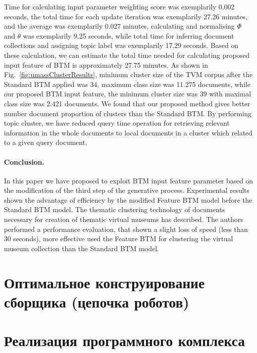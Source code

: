 Time for calculating input parameter weighting score was exemplarily 0.002 seconds, the total time for each update iteration was exemplarily 27.26 minutes, and the average was exemplarily 0.027 minutes, calculating and normalising \(\Phi\) and \(\theta\) was exemplarily 9.25 seconds, while total time for inferring document collections and assigning topic label was exemplarily 17.29 seconds. Based on these calculation, we can estimate the total time needed for calculating proposed input feature of BTM is approximately 27.75 minutes. As shown in Fig.~\cref{fig:umassClusterResults}, minimum cluster size of the TVM corpus after the Standard BTM applied was 34, maximum class size was 11.275 documents, while our proposed BTM input feature, the minimum cluster size was 39 with maximal class size was 2.421 documents. We found that our proposed method gives better number document proportion of clusters than the Standard BTM. By performing topic cluster, we have reduced query time operation for retrieving relevant information in the whole documents to local documents in a cluster which related to a given query document.

\paragraph{Conclusion.} In this paper we have proposed to exploit BTM input feature parameter based on the modification of the third step of the generative process. Experimental results shown the advantage of efficiency by the modified Feature BTM model before the Standard BTM model. The thematic clustering technology of documents necessary for creation of thematic virtual museums has described. The authors performed a performance evaluation, that shown a slight loss of speed (less than 30 seconds), more effective used the Feature BTM for clustering the virtual museum collection than the Standard BTM model.

\section{Оптимальное конструирование сборщика (цепочка роботов)}\label{sec:ch4/sect3}

\section{Реализация программного комплекса}\label{sec:ch4/sect4}

\FloatBarrier

